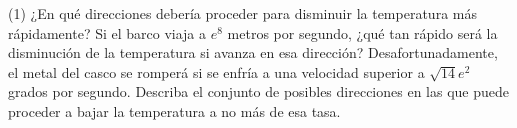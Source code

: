\documentclass[letterpaper,11pt]{article}
\begin{document}
\begin{enumerate}
\begin{tasks}(1)
\task ¿En qué direcciones debería proceder para disminuir la temperatura más rápidamente?
\task Si el barco viaja a $e^8$ metros por segundo, ¿qué tan rápido será la disminución de la temperatura si avanza en esa dirección?
\task Desafortunadamente, el metal del casco se romperá si se enfría a una velocidad superior a $\sqrt{14}e^2$ grados por segundo. Describa el conjunto de posibles direcciones en las que puede proceder a bajar la temperatura a no más de esa tasa.
\end{tasks}


\end{enumerate}
\end{document}
